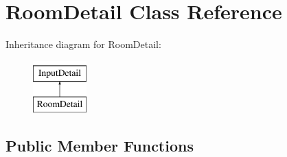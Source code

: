 \hypertarget{classRoomDetail}{\section{Room\-Detail Class Reference}
\label{classRoomDetail}
}
Inheritance diagram for Room\-Detail\-:\begin{figure}[H]
\begin{center}
\leavevmode
\includegraphics[height=2.000000cm]{classRoomDetail}
\end{center}
\end{figure}
\subsection*{Public Member Functions}
